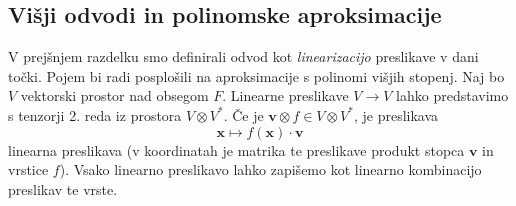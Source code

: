 \documentclass{article}
\newcommand{\x}{\mathbf{x}}
\newcommand{\vv}{\mathbf{v}}
\begin{document}
\subsection{Višji odvodi in polinomske aproksimacije}
V prejšnjem razdelku smo definirali odvod kot \emph{linearizacijo} preslikave v dani
točki. Pojem bi radi posplošili na aproksimacije s polinomi višjih stopenj.  
 Naj bo $V$ vektorski prostor nad obsegom $F$. Linearne preslikave $V\to V$
 lahko predstavimo s tenzorji 2. reda iz prostora $V\otimes V^*$. Če je
 $\vv\otimes f\in V\otimes V^*$, je preslikava
 \begin{equation}
   \label{eq:lin_tenzor}
   \x \mapsto f(\x)\cdot \vv
 \end{equation}
linearna preslikava (v koordinatah je matrika te preslikave produkt stopca $\vv$
in vrstice $f$). Vsako linearno preslikavo lahko zapišemo kot linearno
kombinacijo preslikav te vrste.
\end{document}
